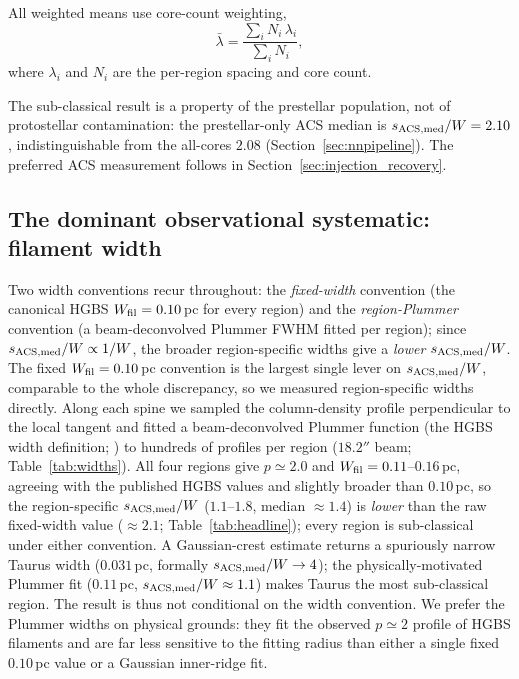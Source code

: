 \documentclass[usenatbib,twoside,twocolumn]{mnras}
\begin{document}
All weighted means use core-count weighting,
\begin{equation}
\bar{\lambda} = \frac{\sum_i N_i\,\lambda_i}{\sum_i N_i},
\label{eq:weighting}
\end{equation}
where $\lambda_i$ and $N_i$ are the per-region spacing and core count.

The sub-classical result is a property of the prestellar population, not of protostellar contamination: the prestellar-only ACS median is $s_{\rm ACS,med}/W=2.10$, indistinguishable from the all-cores $2.08$ (Section~\ref{sec:nnpipeline}). The preferred ACS measurement follows in Section~\ref{sec:injection_recovery}.

\subsection{The dominant observational systematic: filament width}
\label{sec:widths}

Two width conventions recur throughout: the \emph{fixed-width} convention (the canonical HGBS $W_{\rm fil}=0.10$\,pc for every region) and the \emph{region-Plummer} convention (a beam-deconvolved Plummer FWHM fitted per region); since $s_{\rm ACS,med}/W\propto1/W$, the broader region-specific widths give a \emph{lower} $s_{\rm ACS,med}/W$. The fixed $W_{\rm fil}=0.10$\,pc convention is the largest single lever on $s_{\rm ACS,med}/W$, comparable to the whole discrepancy, so we measured region-specific widths directly. Along each spine we sampled the column-density profile perpendicular to the local tangent and fitted a beam-deconvolved Plummer function (the HGBS width definition; \citealt{Arzoumanian2019}) to hundreds of profiles per region ($18.2''$ beam; Table~\ref{tab:widths}). All four regions give $p\simeq2.0$ and $W_{\rm fil}=0.11$--$0.16$\,pc, agreeing with the published HGBS values and slightly broader than $0.10$\,pc, so the region-specific $s_{\rm ACS,med}/W$ ($1.1$--$1.8$, median $\approx1.4$) is \emph{lower} than the raw fixed-width value ($\approx2.1$; Table~\ref{tab:headline}); every region is sub-classical under either convention. A Gaussian-crest estimate returns a spuriously narrow Taurus width ($0.031$\,pc, formally $s_{\rm ACS,med}/W\to4$); the physically-motivated Plummer fit ($0.11$\,pc, $s_{\rm ACS,med}/W\approx1.1$) makes Taurus the most sub-classical region. The result is thus not conditional on the width convention. We prefer the Plummer widths on physical grounds: they fit the observed $p\simeq2$ profile of HGBS filaments and are far less sensitive to the fitting radius than either a single fixed $0.10$\,pc value or a Gaussian inner-ridge fit.
\end{document}
